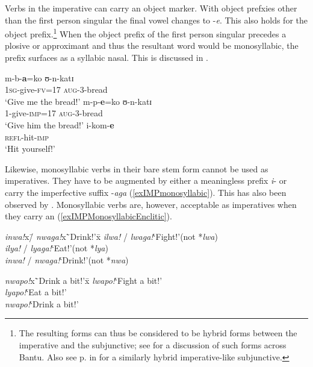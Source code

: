 Verbs in the imperative can carry an object marker. With object prefxies other than the first person singular the final vowel changes to -\textit{e}. This also holds for the  object prefix.\footnote{The resulting forms can thus be considered to be hybrid forms between the imperative and the subjunctive; see \citet[17-22]{DevosVanOlmen2013} for a discussion of such forms across Bantu. Also see p.\nobreakspace\pageref{SUBJohneSM} in  for a similarly hybrid imperative-like subjunctive.} When the object prefix of the first person singular precedes a plosive or approximant and thus the resultant word would be monosyllabic, the prefix surfaces as a syllabic nasal. This is discussed in .
\begin{exe}
\ex\begin{xlist}
\ex\gll m-b-\textbf{a}=ko ʊ-n-katɪ \\
\textsc{1sg}-give-\textsc{fv}=17 \textsc{aug}-3-bread \\
\glt `Give me the bread!'
\ex \gll m-p-\textbf{e}=ko ʊ-n-katɪ \\
1-give-\textsc{imp}=17  \textsc{aug}-3-bread\\
\glt `Give him the bread!'
\ex \gll i-kom-\textbf{e}\\
\textsc{refl}-hit-\textsc{imp}\\
\glt `Hit yourself!'
\end{xlist}
\end{exe}

\label{ImperativesMonosyllabic} Likewise, monosyllabic verbs in their bare stem form cannot be used as imperatives. They have to be augmented by either a meaningless prefix \textit{i}- or carry the imperfective suffix \mbox{-\textit{aga}} (\ref{exIMPmonosyllabic}). This has also been observed by \citet[69]{SchumannK1899}. Monosyllabic verbs are, however, acceptable as imperatives when they carry an  (\ref{exIMPMonosyllabicEnclitic}).
\begin{exe}
\ex\label{exIMPmonosyllabic}
\begin{tabbing}
\textit{inwa!}x\= / \textit{nwaga!}x\=`Drink!'x\=\kill
\textit{ilwa!}\> / \textit{lwaga!}\>`Fight!'\>(not *\textit{lwa})
\\\textit{ilya!}\> / \textit{lyaga!}\>`Eat!'\>(not *\textit{lya})
\\\textit{inwa!}\> / \textit{nwaga!}\>`Drink!'\>(not *\textit{nwa})
\end{tabbing}
\ex \label{exIMPMonosyllabicEnclitic}
\begin{tabbing}
\textit{nwapo!}x\=`Drink a bit!'x\=\kill
\textit{lwapo!}\>`Fight a bit!'\\
\textit{lyapo!}\>`Eat a bit!' \\
\textit{nwapo!}\>`Drink a bit!'
 \end{tabbing}
\end{exe}

